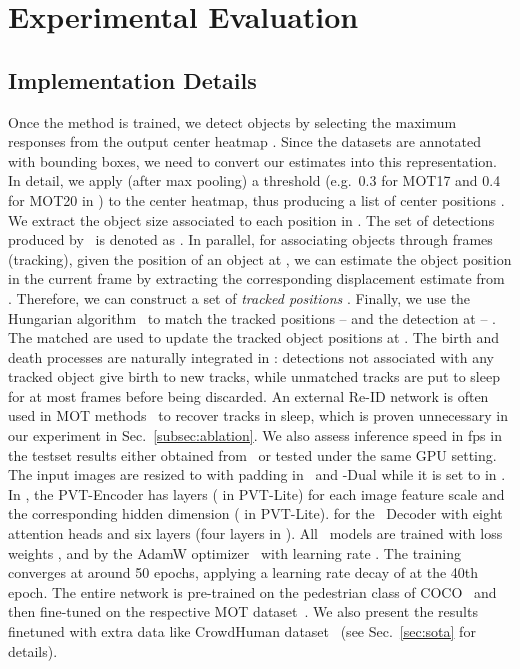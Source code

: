 \section{Experimental Evaluation}\label{sec:exp}
\subsection{Implementation Details}\label{subsec:implementdetails}
 Once the method is trained, we detect objects by selecting the maximum responses from the output center heatmap . Since the datasets are annotated with bounding boxes, we need to convert our estimates into this representation. In detail, we apply (after max pooling) a threshold  (e.g.~0.3 for MOT17 and 0.4 for MOT20 in \method) to the center heatmap, thus producing a list of center positions . We extract the object size  associated to each position  in . The set of detections produced by \method\ is denoted as . In parallel, for associating objects through frames (tracking), given the position of an object  at , we can estimate the object position in the current frame by extracting the corresponding displacement estimate  from . Therefore, we can construct a set of \textit{tracked positions} . Finally, we use the Hungarian algorithm~\cite{Kuhn55thehungarian} to match the tracked positions --  and the detection at  -- . The matched  are used to update the tracked object positions at . The birth and death processes are naturally integrated in \method: detections not associated with any tracked object give birth to new tracks, while unmatched tracks are put to sleep for at most  frames before being discarded. An external Re-ID network is often used in MOT methods~\cite{bergmann2019tracking} to recover tracks in sleep, which is proven unnecessary in our experiment in Sec.~\ref{subsec:ablation}. We also assess inference speed in fps in the testset results either obtained from~\cite{zhang2021bytetrack} or tested under the same GPU setting.
 The input images are resized to  with padding in \method\ and \method-Dual while it is set to  in \methodlite. In \method, the PVT-Encoder has  layers ( in PVT-Lite) for each image feature scale and the corresponding hidden dimension  ( in PVT-Lite).  for the \method\ Decoder with eight attention heads and six layers (four layers in \methodlite). All \method\ models are trained with loss weights ,  and  by the AdamW optimizer~\cite{loshchilov2017decoupled} with learning rate . The training converges at around 50 epochs, applying a learning rate decay of  at the 40th epoch. The entire network is pre-trained on the pedestrian class of COCO~\cite{lin2014microsoft} and then fine-tuned on the respective MOT dataset~\cite{MOT16, MOTChallenge20}.
We also present the results finetuned with extra data like CrowdHuman dataset~\cite{shao2018crowdhuman} (see Sec.~\ref{sec:sota} for details). \newcommand{\gb}{\cellcolor{green!12}}
\newcommand{\ob}{\cellcolor{orange!12}}
\newcommand{\rb}{\cellcolor{red!12}}
\newcommand{\bb}{\cellcolor{black!12}}


